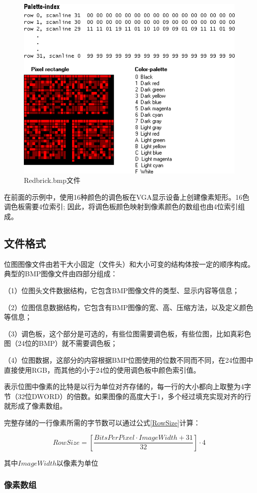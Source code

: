 \documentclass[UTF8]{ctexart}
\begin{document}
\begin{figure}[h!]
	\centering
	\includegraphics[width=0.6\linewidth]{bmpexample.png}
	\caption{Redbrick.bmp文件}
	\label{Redbrickbmp}
\end{figure}

在前面的示例中，使用16种颜色的调色板在VGA显示设备上创建像素矩形。16色调色板需要4位索引; 因此，将调色板颜色映射到像素颜色的数组也由4位索引组成。

\subsection{文件格式}

位图图像文件由若干大小固定（文件头）和大小可变的结构体按一定的顺序构成。典型的BMP图像文件由四部分组成：

（1）位图头文件数据结构，它包含BMP图像文件的类型、显示内容等信息；

（2）位图信息数据结构，它包含有BMP图像的宽、高、压缩方法，以及定义颜色等信息；

（3）调色板，这个部分是可选的，有些位图需要调色板，有些位图，比如真彩色图（24位的BMP）就不需要调色板；

（4）位图数据，这部分的内容根据BMP位图使用的位数不同而不同，在24位图中直接使用RGB，而其他的小于24位的使用调色板中颜色索引值。

表示位图中像素的比特是以行为单位对齐存储的，每一行的大小都向上取整为4字节（32位DWORD）的倍数。如果图像的高度大于1，多个经过填充实现对齐的行就形成了像素数组。

完整存储的一行像素所需的字节数可以通过公式\ref{RowSize}计算：

\begin{equation}\label{RowSize}
    RowSize = [ \frac{BitsPerPixel \cdot ImageWidth + 31}{32} ] \cdot 4
\end{equation}

其中$ImageWidth$以像素为单位

\subsubsection{像素数组}
\end{document}
